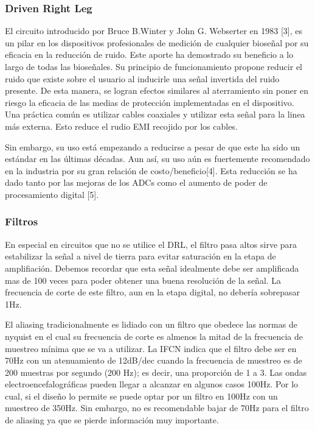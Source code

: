\documentclass[11pt]{article}
\begin{document}
\subsubsection{Driven Right Leg}
\label{sec:orgdc07b38}
El circuito introducido por Bruce B.Winter y John G. Webserter en 1983 [3], es un pilar en los dispositivos profesionales de medición de cualquier bioseñal por su eficacia en la reducción de ruido. Este aporte ha demostrado su beneficio a lo largo de todas las bioseñales. Su principio de funcionamiento propone reducir el ruido que existe sobre el usuario al inducirle una señal invertida del ruido presente. De esta manera, se logran efectos similares al aterramiento sin poner en riesgo la eficacia de las medias de protección implementadas en el dispositivo. Una práctica común es utilizar cables coaxiales y utilizar esta señal para la linea más externa. Esto reduce el rudio EMI recojido por los cables.

Sin embargo, su uso está empezando a reducirse a pesar de que este ha sido un estándar en las últimas décadas. Aun así, su uso aún es fuertemente recomendado en la industria por su gran relación de costo/beneficio[4]. Esta reducción se ha dado tanto por las mejoras de los ADCs como el aumento de poder de procesamiento digital [5].

\subsubsection{Filtros}
\label{sec:orge9fe170}
En especial en circuitos que no se utilice el DRL, el filtro pasa altos sirve para estabilizar la señal a nivel de tierra para evitar saturación en la etapa de amplifiación. Debemos recordar que esta señal idealmente debe ser amplificada mas de 100 veces para poder obtener una buena resolución de la señal. La frecuencia de corte de este filtro, aun en la etapa digital, no debería sobrepasar 1Hz.

El aliasing tradicionalmente es lidiado con un filtro que obedece las normas de nyquist en el cual su frecuencia de corte es almenos la mitad de la frecuencia de muestreo mínima que se va a utilizar. La IFCN indica que el filtro debe ser en 70Hz con un atenuamiento de 12dB/dec cuando la frecuencia de muestreo es de 200 muestras por segundo (200 Hz); es decir, una proporción de 1 a 3. Las ondas electroencefalográficas pueden llegar a alcanzar en algunos casos 100Hz. Por lo cual, si el diseño lo permite se puede optar por un filtro en 100Hz con un muestreo de 350Hz. Sin embargo, no es recomendable bajar de 70Hz para el filtro de aliasing ya que se pierde información muy importante.
\end{document}
